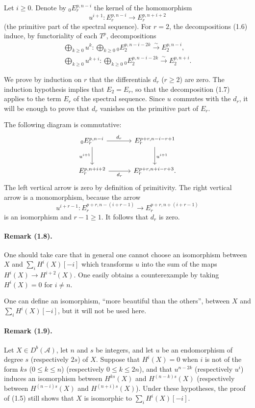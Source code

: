 \documentclass[10pt]{article}
\newcommand{\Acal}{\mathcal A}
\newcommand{\Db}{D^b}
\newcommand{\iso}{\xrightarrow{\sim}}
\begin{document}
Let $i\ge0$. Denote by ${}_0E_r^{p,n-i}$ the kernel of the homomorphism
\[
u^{i+1}:E_r^{p,n-i}\longrightarrow E_r^{p,n+i+2}
\]
(the primitive part of the spectral sequence). For $r=2$, the decompositions (1.6) induce, by functoriality of each $T^p$, decompositions
\[
\tag{1.7}
\begin{gathered}
\bigoplus_{k\ge0}u^k:\bigoplus_{k\ge0}{}_0E_2^{p,n-i-2k}\iso E_2^{p,n-i},\\
\bigoplus_{k\ge0}u^{k+i}:\bigoplus_{k\ge0}{}_0E_2^{p,n-i-2k}\iso E_2^{p,n+i}.
\end{gathered}
\]

We prove by induction on $r$ that the differentials $d_r$ ($r\ge2$) are zero. The induction hypothesis implies that $E_2=E_r$, so that the decomposition (1.7) applies to the term $E_r$ of the spectral sequence. Since $u$ commutes with the $d_r$, it will be enough to prove that $d_r$ vanishes on the primitive part of $E_r$.

The following diagram is commutative:
\[
\begin{tikzcd}[column sep=3.2em,row sep=2.6em]
{}_0E_r^{p,n-i} \arrow[r,"d_r"] \arrow[d,"u^{i+1}"'] & E_r^{p+r,n-i-r+1} \arrow[d,"u^{i+1}"]\\
E_r^{p,n+i+2} \arrow[r,"d_r"'] & E_r^{p+r,n+i-r+3}.
\end{tikzcd}
\]
The left vertical arrow is zero by definition of primitivity. The right vertical arrow is a monomorphism, because the arrow
\[
u^{i+r-1}:E_r^{p+r,n-(i+r-1)}\longrightarrow E_r^{p+r,n+(i+r-1)}
\]
is an isomorphism and $r-1\ge1$. It follows that $d_r$ is zero.

\paragraph{Remark (1.8).} One should take care that in general one cannot choose an isomorphism between $X$ and $\sum_iH^i(X)[-i]$ which transforms $u$ into the sum of the maps $H^i(X)\to H^{i+2}(X)$. One easily obtains a counterexample by taking $H^i(X)=0$ for $i\ne n$.

One can define an isomorphism, ``more beautiful than the others'', between $X$ and $\sum_iH^i(X)[-i]$, but it will not be used here.

\paragraph{Remark (1.9).} Let $X\in\Db(\Acal)$, let $n$ and $s$ be integers, and let $u$ be an endomorphism of degree $s$ (respectively $2s$) of $X$. Suppose that $H^i(X)=0$ when $i$ is not of the form $ks$ ($0\le k\le n$) (respectively $0\le k\le2n$), and that $u^{n-2k}$ (respectively $u^i$) induces an isomorphism between $H^{ks}(X)$ and $H^{(n-k)s}(X)$ (respectively between $H^{(n-i)s}(X)$ and $H^{(n+i)s}(X)$). Under these hypotheses, the proof of (1.5) still shows that $X$ is isomorphic to $\sum_iH^i(X)[-i]$.
\end{document}
